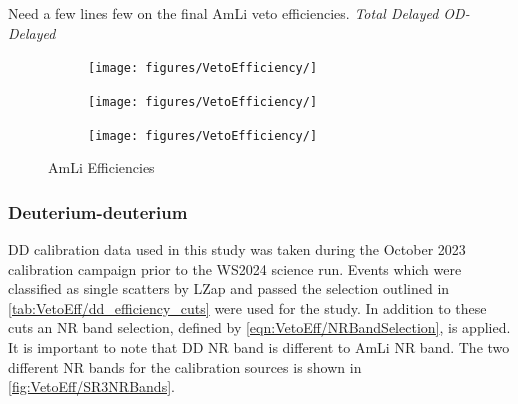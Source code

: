 {\color{red} Need a few lines few on the final AmLi veto efficiencies. \textit{Total Delayed OD-Delayed}}
\begin{figure}[!ht]
    \centering
    \begin{subfigure}[b]{0.49\textwidth}
        \centering
        \texttt{[image: figures/VetoEfficiency/]}
        \caption{}
        \label{fig:VetoEff/AmLiEfficiency_All}
    \end{subfigure}
    \hfill
    \begin{subfigure}[b]{0.49\textwidth}
        \centering
        \texttt{[image: figures/VetoEfficiency/]}
        \caption{}
        \label{fig:VetoEff/AmLiEfficiency_Delayed}
    \end{subfigure}
    \hfill
    \begin{subfigure}[b]{0.49\textwidth}
        \centering
        \texttt{[image: figures/VetoEfficiency/]}
        \caption{}
        \label{fig:VetoEff/AmLiEfficiency_ODDelayed}
    \end{subfigure}
    \caption{AmLi Efficiencies}
    \label{fig:VetoEff/AmLiEfficiencies}
\end{figure}

\subsubsection{Deuterium-deuterium}
DD calibration data used in this study was taken during the October 2023 calibration campaign prior to the WS2024 science run. Events which were classified as single scatters by LZap and passed the selection outlined in \autoref{tab:VetoEff/dd_efficiency_cuts} were used for the study. In addition to these cuts an NR band selection, defined by \autoref{eqn:VetoEff/NRBandSelection}, is applied. It is important to note that DD NR band is different to AmLi NR band. The two different NR bands for the calibration sources is shown in \autoref{fig:VetoEff/SR3NRBands}.

